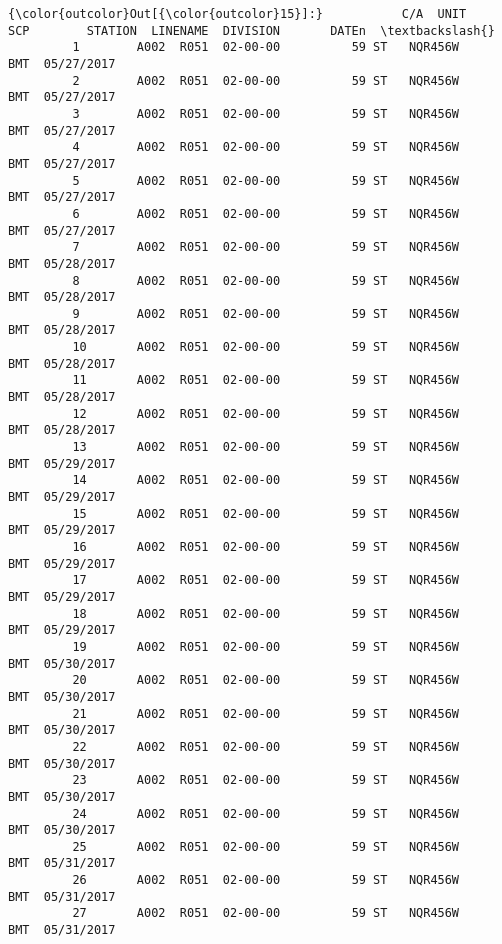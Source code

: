\documentclass[11pt]{article}
\begin{document}
\begin{Verbatim}[commandchars=\\\{\}]
{\color{outcolor}Out[{\color{outcolor}15}]:}           C/A  UNIT       SCP        STATION  LINENAME  DIVISION       DATEn  \textbackslash{}
         1        A002  R051  02-00-00          59 ST   NQR456W       BMT  05/27/2017   
         2        A002  R051  02-00-00          59 ST   NQR456W       BMT  05/27/2017   
         3        A002  R051  02-00-00          59 ST   NQR456W       BMT  05/27/2017   
         4        A002  R051  02-00-00          59 ST   NQR456W       BMT  05/27/2017   
         5        A002  R051  02-00-00          59 ST   NQR456W       BMT  05/27/2017   
         6        A002  R051  02-00-00          59 ST   NQR456W       BMT  05/27/2017   
         7        A002  R051  02-00-00          59 ST   NQR456W       BMT  05/28/2017   
         8        A002  R051  02-00-00          59 ST   NQR456W       BMT  05/28/2017   
         9        A002  R051  02-00-00          59 ST   NQR456W       BMT  05/28/2017   
         10       A002  R051  02-00-00          59 ST   NQR456W       BMT  05/28/2017   
         11       A002  R051  02-00-00          59 ST   NQR456W       BMT  05/28/2017   
         12       A002  R051  02-00-00          59 ST   NQR456W       BMT  05/28/2017   
         13       A002  R051  02-00-00          59 ST   NQR456W       BMT  05/29/2017   
         14       A002  R051  02-00-00          59 ST   NQR456W       BMT  05/29/2017   
         15       A002  R051  02-00-00          59 ST   NQR456W       BMT  05/29/2017   
         16       A002  R051  02-00-00          59 ST   NQR456W       BMT  05/29/2017   
         17       A002  R051  02-00-00          59 ST   NQR456W       BMT  05/29/2017   
         18       A002  R051  02-00-00          59 ST   NQR456W       BMT  05/29/2017   
         19       A002  R051  02-00-00          59 ST   NQR456W       BMT  05/30/2017   
         20       A002  R051  02-00-00          59 ST   NQR456W       BMT  05/30/2017   
         21       A002  R051  02-00-00          59 ST   NQR456W       BMT  05/30/2017   
         22       A002  R051  02-00-00          59 ST   NQR456W       BMT  05/30/2017   
         23       A002  R051  02-00-00          59 ST   NQR456W       BMT  05/30/2017   
         24       A002  R051  02-00-00          59 ST   NQR456W       BMT  05/30/2017   
         25       A002  R051  02-00-00          59 ST   NQR456W       BMT  05/31/2017   
         26       A002  R051  02-00-00          59 ST   NQR456W       BMT  05/31/2017   
         27       A002  R051  02-00-00          59 ST   NQR456W       BMT  05/31/2017   

\end{Verbatim}
\end{document}
